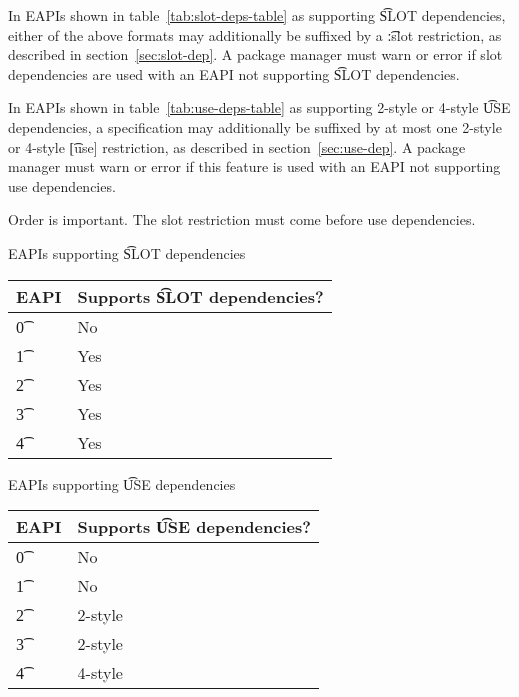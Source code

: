 In EAPIs shown in table~\ref{tab:slot-deps-table} as supporting \t{SLOT} dependencies, either of the
above formats may additionally be suffixed by a \t{:slot} restriction, as described in
section~\ref{sec:slot-dep}. A package manager must warn or error if slot dependencies are used with an
EAPI not supporting \t{SLOT} dependencies.

 In EAPIs shown in table~\ref{tab:use-deps-table} as supporting 2-style
or 4-style \t{USE} dependencies, a specification may additionally be suffixed by at most one
2-style or 4-style \t{[use]} restriction, as described in section~\ref{sec:use-dep}. A package
manager must warn or error if this feature is used with an EAPI not supporting use dependencies.

\note Order is important. The slot restriction must come before use dependencies.

\begin{centertable}{EAPIs supporting \t{SLOT} dependencies} \label{tab:slot-deps-table}
    \begin{tabular}{ l l }
        \toprule
            \multicolumn{1}{c}{\textbf{EAPI}} &
            \multicolumn{1}{c}{\textbf{Supports \t{SLOT} dependencies?}} \\
            \midrule
    \t{0} & No \\
    \t{1} & Yes \\
    \t{2} & Yes \\
    \t{3} & Yes \\
    \t{4} & Yes \\
    \bottomrule
    \end{tabular}
\end{centertable}

\begin{centertable}{EAPIs supporting \t{USE} dependencies} \label{tab:use-deps-table}
    \begin{tabular}{ l l }
        \toprule
        \multicolumn{1}{c}{\textbf{EAPI}} &
        \multicolumn{1}{c}{\textbf{Supports \t{USE} dependencies?}} \\
        \midrule
    \t{0} & No \\
    \t{1} & No \\
    \t{2} & 2-style \\
    \t{3} & 2-style \\
    \t{4} & 4-style \\
    \bottomrule
    \end{tabular}
\end{centertable}

